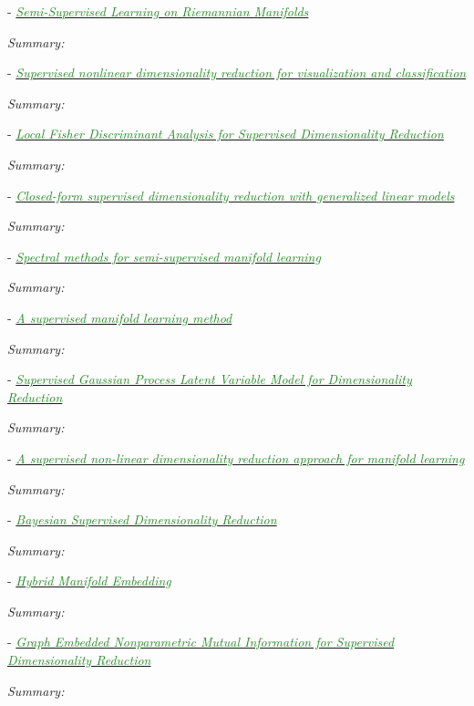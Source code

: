 \documentclass[]{article}
\newcommand{\paperentry}[4]{
            \hangindent=1cm
            \textcolor{red}{\cite{#1}} - \href{run:../References/#3}{\textcolor{ForestGreen}{\textit{#2}}}
            
            \noindent            
            \begin{minipage}[t]{0.1\linewidth}\hfill\end{minipage}
            \begin{minipage}[t]{0.8\linewidth}\textcolor{NavyBlue}{{\textit{Summary:}}}#4\end{minipage}
            \vspace{.25cm}
          }
\begin{document}
	
	\paperentry{Belkin2004SemiSupLearningRiemannianManifolds}
	{Semi-Supervised Learning on Riemannian Manifolds}
	{Manifold_Representation_Learning/Supervised/Belkin2004SemiSupLearningRiemannianManifolds.pdf}
	{}
	
	\paperentry{Geng2005SupNonlinearDimRed}
	{Supervised nonlinear dimensionality reduction for visualization and classification}
	{Manifold_Representation_Learning/Supervised/Geng2005SupNonlinearDimRed.pdf}
	{}
	
	\paperentry{Sugiyama2006FDASupDimRed}
	{Local Fisher Discriminant Analysis for Supervised Dimensionality Reduction}
	{Manifold_Representation_Learning/Supervised/Sugiyama2006FDASupDimRed.pdf}
	{}
	
	\paperentry{Rish2008SupDimRedGLM}
	{Closed-form supervised dimensionality reduction with generalized linear models}
	{Manifold_Representation_Learning/Supervised/Rish2008SupDimRedGLM.pdf}
	{}
	
	\paperentry{Zhang2008SpectralSemiSupManifoldLearning}
	{Spectral methods for semi-supervised manifold learning}
	{Manifold_Representation_Learning/Supervised/Zhang2008SpectralSemiSupManifoldLearning.pdf}
	{}
	
	\paperentry{Li2009SupManifoldLearning}
	{A supervised manifold learning method}
	{Manifold_Representation_Learning/Supervised/Li2009SupManifoldLearning.pdf}
	{}
	
	\paperentry{Gao2011SupGPLVMDimRed}
	{Supervised Gaussian Process Latent Variable Model for Dimensionality Reduction}
	{Manifold_Representation_Learning/Supervised/Gao2011SupGPLVMDimRed.pdf}
	{}
	
	
	\paperentry{Raducanu2012SupervisedNonlinearDimReduction}
	{A supervised non-linear dimensionality reduction approach for manifold learning}
	{Manifold_Representation_Learning/Supervised/Raducanu2012SupervisedNonlinearDimReduction.pdf}
	{}
	
	\paperentry{Gonen2013BayesianSupDimRed}
	{Bayesian Supervised Dimensionality Reduction}
	{Manifold_Representation_Learning/Supervised/Gonen2013BayesianSupDimRed.pdf}
	{}
	
	\paperentry{Liu2014HybridManifoldEmbedding}
	{Hybrid Manifold Embedding}
	{Manifold_Representation_Learning/Supervised/Liu2014HybridManifoldEmbedding.pdf}
	{}
	
	\paperentry{Bouzas2015GraphEmbeddedMutualInformationSupDimRed}
	{Graph Embedded Nonparametric Mutual Information for Supervised Dimensionality Reduction}
	{Manifold_Representation_Learning/Supervised/Bouzas2015GraphEmbeddedMutualInformationSupDimRed.pdf}
	{}
	
\end{document}
